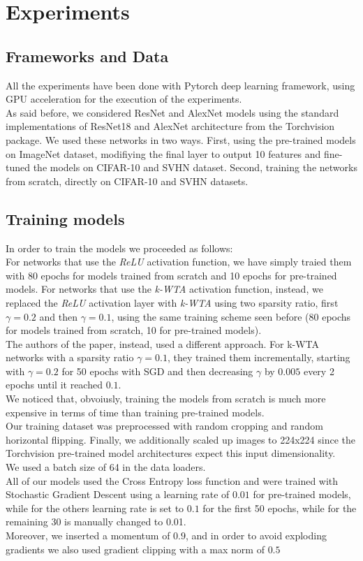 \documentclass[a4paper]{article}
\begin{document}
	\section{Experiments}
	\subsection{Frameworks and Data}
	All the experiments have been done with Pytorch deep learning framework, using GPU acceleration for the execution of the experiments.\\
	As said before, we considered ResNet and AlexNet models using the standard implementations of ResNet18 and AlexNet architecture from the Torchvision package. We used these networks in two ways. First, using the pre-trained models on ImageNet dataset, modifiying the final layer to output 10 features and fine-tuned the models on CIFAR-10 and SVHN dataset. Second, training the networks from scratch, directly on CIFAR-10 and SVHN datasets.
	
	\subsection{Training models}
	In order to train the models we proceeded as follows: \\
	For networks that use the \textit{ReLU} activation function, we have simply traied them with 80 epochs for models trained from scratch and 10 epochs for pre-trained models. For networks that use the \textit{k-WTA} activation function, instead, we replaced the \textit{ReLU} activation layer with \textit{k-WTA} using two sparsity ratio, first $\gamma = 0.2$ and then $\gamma = 0.1$, using the same training scheme seen before (80 epochs for models trained from scratch, 10 for pre-trained models). \\
	The authors of the paper, instead, used a different approach. For k-WTA networks with a sparsity ratio $\gamma = 0.1$, they trained them incrementally, starting with $\gamma = 0.2$ for 50 epochs with SGD and then decreasing $\gamma$ by $0.005$ every 2 epochs until it reached $0.1$. \\
	We noticed that, obvoiusly, training the models from scratch is much more expensive in terms of time than training pre-trained models.\\
	Our training dataset was preprocessed with random cropping and random horizontal flipping. Finally, we additionally scaled up images to 224x224 since the Torchvision pre-trained model architectures expect this input dimensionality.\\
	We used a batch size of 64 in the data loaders.\\
	All of our models used the Cross Entropy loss function and were trained with Stochastic Gradient Descent using	a learning rate of $0.01$ for pre-trained models, while for the others learning rate is set to $0.1$ for the first 50 epochs, while for the remaining 30 is manually changed to 0.01. \\ Moreover, we inserted a momentum of $0.9$, and in order to avoid exploding gradients we also used gradient clipping with a max norm of $0.5$
	
\end{document}
